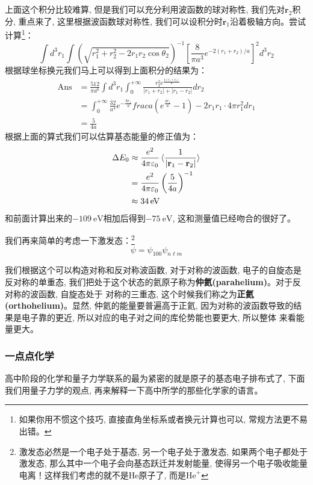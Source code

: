 \documentclass[a4paper,zihao=-4,linespread=1]{ctexrep}
\begin{document}
    上面这个积分比较难算, 但是我们可以充分利用波函数的球对称性, 我们先对$\mathbf{r}_2$积分, 重点来了, 这里根据波函数球对称性, 我们可以设积分时$\mathbf{r}_1$沿着极轴方向。尝试计算\footnote{如果你用不惯这个技巧, 直接直角坐标系或者换元计算也可以, 常规方法更不易出错。}：
    \begin{equation}
        \int d^3r_1 \int \left(\sqrt{r_{1}^{2}+r_{2}^{2}-2 r_{1} r_{2} \cos \theta_{2}}\right)^{-1}\left[\frac{8}{\pi a^{3}} e^{-2\left(r_{1}+r_{2}\right) / a}\right]^2d^3r_2
    \end{equation}
    根据球坐标换元我们马上可以得到上面积分的结果为：
    \begin{align*}
        \mathrm{Ans}&=\frac{512}{\pi a^6}\int d^3r_1\int_0^{+\infty}\frac{r_2^2 e^{\frac{4(r_1+r_2)}{a}}}{|r_1+r_2|+|r_1-r_2|}dr_2\\
        &=\int_0^{+\infty}\frac{32}{a^4}e^{-\frac{8r_1}{a}}frac{a(e^{\frac{4r_1}{a}}-1)-2r_1}{r_1}\cdot 4\pi r_1^2dr_1\\
        &=\boxed{\frac{5}{4a}}
    \end{align*}
    根据上面的算式我们可以估算基态能量的修正值为：
    \begin{align*}
        \Delta E_0&\approx\frac{e^2}{4\pi\varepsilon_0}\braket{\frac{1}{\left|\mathbf{r}_1-\mathbf{r}_2\right|}}\\&=\frac{e^2}{4\pi\varepsilon_0}\left(\frac{5}{4a}\right)^{-1}\\
        &\approx\SI{34}{\eV}
    \end{align*}
    和前面计算出来的$\SI{-109}{\eV}$相加后得到$\SI{-75}{\eV}$, 这和测量值已经吻合的很好了。

    我们再来简单的考虑一下激发态：\footnote{激发态必然是一个电子处于基态, 另一个电子处于激发态, 如果两个电子都处于激发态, 那么其中一个电子会向基态跃迁并发射能量, 使得另一个电子吸收能量电离！这样我们考虑的就不是$\mathrm{He}$原子了, 而是$\mathrm{He}^+$}
    \[\psi=\psi_{100}\psi_{n\ell m}\]

    我们根据这个可以构造对称和反对称波函数, 对于对称的波函数, 电子的自旋态是反对称的单重态, 我们把处于这个状态的氦原子称为\textbf{仲氦(parahelium)}。对于反对称的波函数, 自旋态处于
    对称的三重态, 这个时候我们称之为\textbf{正氦(orthohelium)}。显然, 仲氦的能量要普遍高于正氦, 因为对称的波函数导致的结果是电子靠的更近, 所以对应的电子对之间的库伦势能也要更大, 所以整体
    来看能量更大。

    \subsubsection*{一点点化学}
    高中阶段的化学和量子力学联系的最为紧密的就是原子的基态电子排布式了, 下面我们用量子力学的观点, 再来解释一下高中所学的那些化学家的语言。
\end{document}

